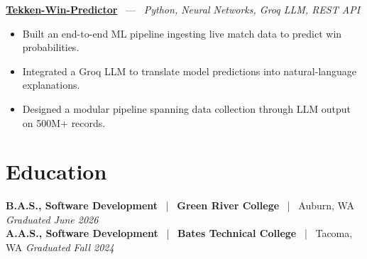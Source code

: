 \documentclass[10pt, letterpaper]{article}
\newcommand{\jobhead}[4]{%
  \vspace{5pt}%
  {\bfseries\color{dark}#1}%
  ~{\color{light}|}~%
  {\bfseries\color{navy}#2}%
  ~{\color{light}|}~%
  {\color{light}#3}%
  \hfill{\color{light}\small\textit{#4}}\\[-2pt]%
}
\newcommand{\projhead}[3]{%
  \vspace{5pt}%
  {\bfseries\color{dark}\href{#2}{#1}}%
  ~{\color{light}---}~%
  {\color{light}\small\textit{#3}}\\[-2pt]%
}
\begin{document}
\projhead{Tekken-Win-Predictor}{}{Python, Neural Networks, Groq LLM, REST API}
\begin{itemize}
  \item Built an end-to-end ML pipeline ingesting live match data to predict win probabilities.
  \item Integrated a Groq LLM to translate model predictions into natural-language explanations.
  \item Designed a modular pipeline spanning data collection through LLM output on 500M+ records.
\end{itemize}

\section{Education}

\jobhead{B.A.S., Software Development}{Green River College}{Auburn, WA}{Graduated June 2026}
\jobhead{A.A.S., Software Development}{Bates Technical College}{Tacoma, WA}{Graduated Fall 2024}
\end{document}
